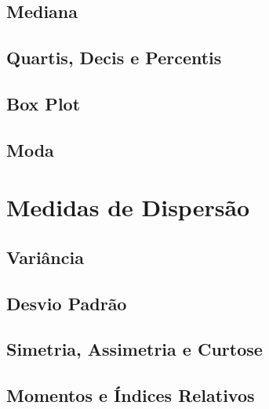 \documentclass[a4paper,12pt]{book}
\theoremstyle{definition} %
\theoremstyle{definition}
\begin{document}
\section{Mediana}

\section{Quartis, Decis e Percentis}

\section{Box Plot}

\section{Moda}

\chapter{Medidas de Dispersão}

\section{{Variância}}

\section{Desvio Padrão}

\section{Simetria, Assimetria e Curtose}

\section{Momentos e Índices Relativos}

\end{document}
